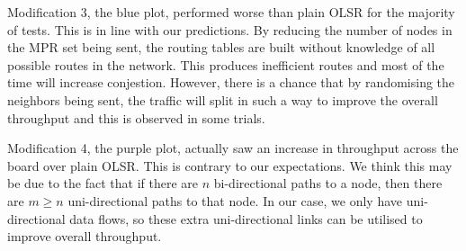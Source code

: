 \documentclass[12pt,a4paper]{article}
\begin{document}
Modification 3, the blue plot, performed worse than plain OLSR for the majority of tests. This is in line with our predictions. By reducing the number of nodes in the MPR set being sent, the routing tables are built without knowledge of all possible routes in the network. This produces inefficient routes and most of the time will increase conjestion. However, there is a chance that by randomising the neighbors being sent, the traffic will split in such a way to improve the overall throughput and this is observed in some trials. 

Modification 4, the purple plot, actually saw an increase in throughput across the board over plain OLSR. This is contrary to our expectations. We think this may be due to the fact that if there are \(n\) bi-directional paths to a node, then there are \(m \geq n\) uni-directional paths to that node. In our case, we only have uni-directional data flows, so these extra uni-directional links can be utilised to improve overall throughput.



\end{document}
